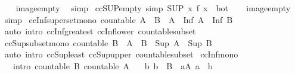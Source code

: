 \begin{isabellebody}
%
\isadelimproof
\ \ %
\endisadelimproof
%
\isatagproof
{}\isamarkupfalse%
\ image{\isacharunderscore}empty\ \isamarkupfalse%
\ simp%
\endisatagproof
{\isafoldproof}%
%
\isadelimproof
\isanewline
%
\endisadelimproof
\isanewline
{}\isamarkupfalse%
\ ccSUP{\isacharunderscore}empty\ {\isacharbrackleft}simp{\isacharbrackright}{\isacharcolon}\ {\isachardoublequoteopen}{\isacharparenleft}SUP\ x{\isacharcolon}{\isacharbraceleft}{\isacharbraceright}{\isachardot}\ f\ x{\isacharparenright}\ {\isacharequal}\ bot{\isachardoublequoteclose}\isanewline
%
\isadelimproof
\ \ %
\endisadelimproof
%
\isatagproof
{}\isamarkupfalse%
\ image{\isacharunderscore}empty\ \isamarkupfalse%
\ simp%
\endisatagproof
{\isafoldproof}%
%
\isadelimproof
\isanewline
%
\endisadelimproof
\isanewline
{}\isamarkupfalse%
\ ccInf{\isacharunderscore}superset{\isacharunderscore}mono{\isacharcolon}\ {\isachardoublequoteopen}countable\ A\ {\isasymLongrightarrow}\ B\ {\isasymsubseteq}\ A\ {\isasymLongrightarrow}\ Inf\ A\ {\isasymle}\ Inf\ B{\isachardoublequoteclose}\isanewline
%
\isadelimproof
\ \ %
\endisadelimproof
%
\isatagproof
{}\isamarkupfalse%
\ {\isacharparenleft}auto\ intro{\isacharcolon}\ ccInf{\isacharunderscore}greatest\ ccInf{\isacharunderscore}lower\ countable{\isacharunderscore}subset{\isacharparenright}%
\endisatagproof
{\isafoldproof}%
%
\isadelimproof
\isanewline
%
\endisadelimproof
\isanewline
{}\isamarkupfalse%
\ ccSup{\isacharunderscore}subset{\isacharunderscore}mono{\isacharcolon}\ {\isachardoublequoteopen}countable\ B\ {\isasymLongrightarrow}\ A\ {\isasymsubseteq}\ B\ {\isasymLongrightarrow}\ Sup\ A\ {\isasymle}\ Sup\ B{\isachardoublequoteclose}\isanewline
%
\isadelimproof
\ \ %
\endisadelimproof
%
\isatagproof
{}\isamarkupfalse%
\ {\isacharparenleft}auto\ intro{\isacharcolon}\ ccSup{\isacharunderscore}least\ ccSup{\isacharunderscore}upper\ countable{\isacharunderscore}subset{\isacharparenright}%
\endisatagproof
{\isafoldproof}%
%
\isadelimproof
\isanewline
%
\endisadelimproof
\isanewline
{}\isamarkupfalse%
\ ccInf{\isacharunderscore}mono{\isacharcolon}\isanewline
\ \ \ {\isacharbrackleft}intro{\isacharbrackright}{\isacharcolon}\ {\isachardoublequoteopen}countable\ B{\isachardoublequoteclose}\ {\isachardoublequoteopen}countable\ A{\isachardoublequoteclose}\isanewline
\ \ \ {\isachardoublequoteopen}{\isasymAnd}b{\isachardot}\ b\ {\isasymin}\ B\ {\isasymLongrightarrow}\ {\isasymexists}a{\isasymin}A{\isachardot}\ a\ {\isasymle}\ b{\isachardoublequoteclose}\isanewline

\end{isabellebody}
